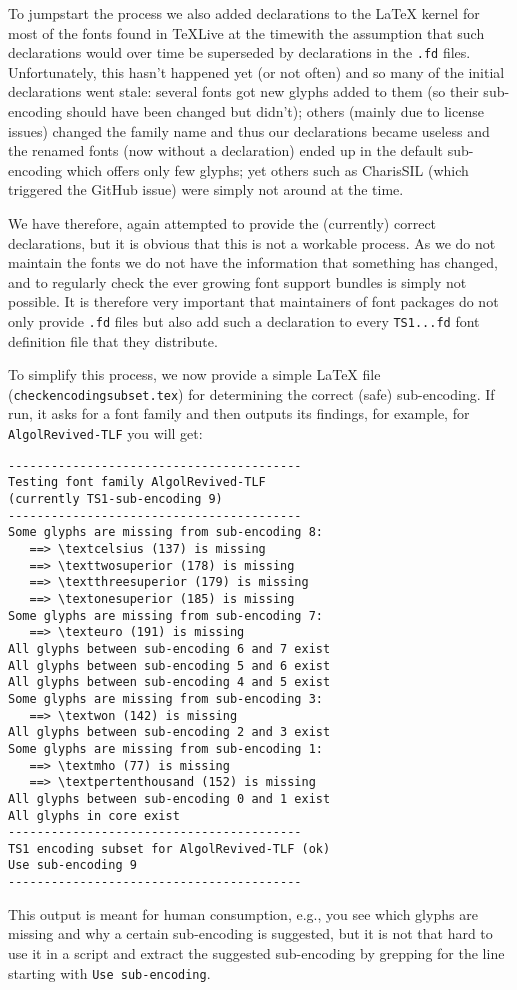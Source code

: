 \documentclass{ltnews}
\providecommand\Dash {\unskip \textemdash}
\begin{document}
To jumpstart the process we also added declarations to the \LaTeX{}
kernel for most of the fonts found in \TeX{}Live at the time\Dash with
the assumption that such declarations would over time be superseded by
declarations in the \texttt{.fd} files. Unfortunately, this hasn't
happened yet (or not often) and so many of the initial declarations
went stale: several fonts got new glyphs added to them (so their
sub-encoding should have been changed but didn't); others (mainly due
to license issues) changed the family name and thus our declarations
became useless and the renamed fonts (now without a declaration) ended
up in the default sub-encoding which offers only few glyphs; yet
others such as CharisSIL (which triggered the GitHub issue) were
simply not around at the time.

We have therefore, again attempted to provide the (currently) correct
declarations, but it is obvious that this is not a workable
process. As we do not maintain the fonts we do not have the
information that something has changed, and to regularly check the
ever growing font support bundles is simply not possible. It is
therefore very important that maintainers of font packages do not only
provide \texttt{.fd} files but also add such a declaration to every
\texttt{TS1...fd} font definition file that they distribute.

To simplify this process, we now provide a simple \LaTeX{} file
(\texttt{checkencodingsubset.tex}) for determining the correct (safe)
sub-encoding. If run, it asks for a font family and then outputs its
findings, for example, for \texttt{AlgolRevived-TLF} you will get:
\begin{verbatim}
-----------------------------------------
Testing font family AlgolRevived-TLF
(currently TS1-sub-encoding 9)
-----------------------------------------
Some glyphs are missing from sub-encoding 8:
   ==> \textcelsius (137) is missing
   ==> \texttwosuperior (178) is missing
   ==> \textthreesuperior (179) is missing
   ==> \textonesuperior (185) is missing
Some glyphs are missing from sub-encoding 7:
   ==> \texteuro (191) is missing
All glyphs between sub-encoding 6 and 7 exist
All glyphs between sub-encoding 5 and 6 exist
All glyphs between sub-encoding 4 and 5 exist
Some glyphs are missing from sub-encoding 3:
   ==> \textwon (142) is missing
All glyphs between sub-encoding 2 and 3 exist
Some glyphs are missing from sub-encoding 1:
   ==> \textmho (77) is missing
   ==> \textpertenthousand (152) is missing
All glyphs between sub-encoding 0 and 1 exist
All glyphs in core exist
-----------------------------------------
TS1 encoding subset for AlgolRevived-TLF (ok)
Use sub-encoding 9
-----------------------------------------
\end{verbatim}
This output is meant for human consumption, e.g., you see which glyphs
are missing and why a certain sub-encoding is suggested, but it is not
that hard to use it in a script and extract the suggested sub-encoding
by grepping for the line starting with \texttt{Use sub-encoding}.
\end{document}
